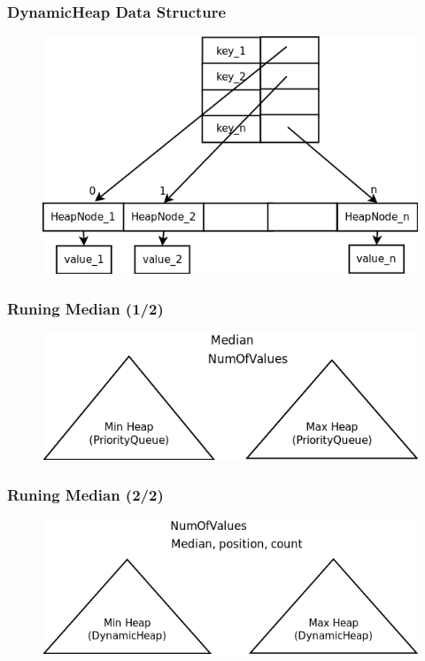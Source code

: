\documentclass[]{beamer}
\begin{document}
\begin{frame}
\frametitle{DynamicHeap Data Structure}

\begin{figure}
        \includegraphics[width=0.7\linewidth]{DinamicHeap.png}
\end{figure}

\end{frame}

\begin{frame}
\frametitle{Runing Median (1/2)}

\begin{figure}
        \includegraphics[width=0.8\linewidth]{runningmediang.png}
\end{figure}

\end{frame}


\begin{frame}
\frametitle{Runing Median (2/2)}

\begin{figure}
        \includegraphics[width=0.8\linewidth]{runningmediand.png}
\end{figure}

\end{frame}
\end{document}
